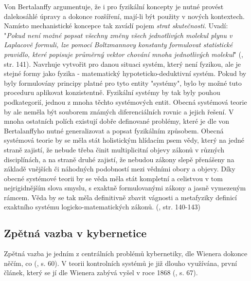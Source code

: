 \documentclass[11pt,a4paper]{article}
\begin{document}
Von Bertalanffy argumentuje, že i pro fyzikální koncepty je nutné provést dalekosáhlé úpravy a dokonce rozšíření, mají-li být použity v nových kontextech. Namísto mechanistické koncepce tak zavádí pojem \textit{strat skutečnosti}. Uvadí:  "\textit{Pokud není možné popsat všechny změny všech jednotlivých molekul plynu v Laplacově formuli, lze pomocí Boltzmannovy konstanty formulovat statistické pravidlo, které popisuje průměrný vektor chování mnoha jednotlivých molekul}" (\cite*{von_bertalanffy_outline_1950}, str. 141). Navrhuje vytvořit pro danou situaci systém, který není fyzikou, ale je stejné formy jako fyzika - matematický hypoteticko-deduktivní systém. Pokud by byly formulovány principy platné pro tyto entity "systémy", bylo by možné tuto proceduru aplikovat konzistentně. Fyzikální systémy by tak byly pouhou podkategorií, jednou z mnoha těchto systémových entit. Obecná systémová teorie by ale neměla být souborem známých diferenciálních rovnic a jejich řešení. V mnoha ostatních polích existují dobře definované problémy, které je dle von Bertalanffyho nutné generalizovat a popsat fyzikálním způsobem. Obecná systémová teorie by se měla stát holistickým hlídacím psem vědy, který na jedné straně zajistí, že nebude třeba činit multiplicitní objevy zákonů v různých disciplínách, a na straně druhé zajistí, že nebudou zákony slepě přenášeny na základě vnějších či náhodných podobností mezi vědními obory a objevy. Díky obecné systémové teorii by se věda měla stát kompletní a celistvou v tom nejrigidnějším slova smyslu, s exaktně formulovanými zákony a jasně vymezeným rámcem. Věda by se tak měla definitivně zbavit vágnosti a metafyziky definicí exaktního systému logicko-matematických zákonů. (\cite{von_bertalanffy_outline_1950}, str. 140-143)


\subsection{Zpětná vazba v kybernetice}

Zpětná vazba je jedním z centrálních problémů kybernetiky, dle Wienera dokonce něčím, co (\cite{wiener_cybernetics_2019}, s. 60). 
V teorii kontrolních systémů je již dlouho využívána, první článek, který se jí dle Wienera zabývá vyšel v roce 1868 (\cite{maxwell_governors_1868, wiener_cybernetics_2019}, s. 67). 
\end{document}
